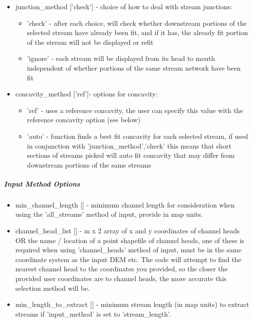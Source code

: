 \begin{itemize}
	\item junction\_method ['check'] - choice of how to deal with stream junctions:
	\begin{itemize}
		\item 'check' - after each choice, will check whether downstream portions of the selected stream have already been fit, and if it has,
		the already fit portion of the stream will not be displayed or refit
		\item 'ignore' - each stream will be displayed from its head to mouth independent of whether portions of the same stream network have 
		been fit
	\end{itemize}
	
	\item concavity\_method ['ref']- options for concavity:
	\begin{itemize}
		\item 'ref' - uses a reference concavity, the user can specify this value with the reference concavity option (see below)
		\item 'auto' - function finds a best fit concavity for each selected stream, if used in conjunction with 'junction\_method','check'
		this means that short sections of streams picked will auto fit concavity that may differ from downstream portions of the same
		streams
	\end{itemize}
\end{itemize}


\subparagraph{Input Method Options }
\begin{itemize}
\item min\_channel\_length [] - minimum channel length for consideration when using the 'all\_streams' method of input, provide in map units.
\item channel\_head\_list [] - m x 2 array of x and y coordinates of channel heads OR the name / location of a point shapefile of channel heads, 
one of these is required when using 'channel\_heads' method of input, must be in the same coordinate system as the input DEM etc. 
The code will attempt to find the nearest channel head to the coordinates you provided, so the closer the provided user coordinates
are to channel heads, the more accurate this selection method will be.
\item min\_length\_to\_extract [] - minimum stream length (in map units) to extract streams if 'input\_method' is set to 'stream\_length'.
\end{itemize}

